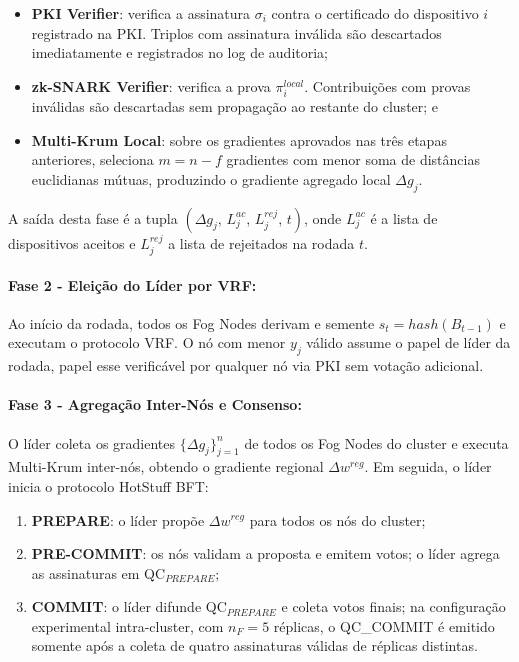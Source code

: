 \documentclass[12pt]{article}
\begin{document}
\begin{itemize}
\item \textbf{PKI Verifier}: verifica a assinatura $\sigma_i$ contra o certificado do dispositivo $i$ registrado na PKI. Triplos com assinatura inválida são descartados imediatamente e registrados no log de auditoria;
\item \textbf{zk-SNARK Verifier}: verifica a prova $\pi_i^{{local}}$. Contribuições com provas inválidas são descartadas sem propagação ao restante do cluster; e
\item \textbf{Multi-Krum Local}: sobre os gradientes aprovados nas três etapas anteriores, seleciona $m = n - f$ gradientes com menor soma de distâncias euclidianas mútuas, produzindo o gradiente agregado local $\Delta g_j$.
\end{itemize}

A saída desta fase é a tupla $(\Delta g_j,\, L_j^{{ac}},\, L_j^{{rej}},\, t)$, onde $L_j^{{ac}}$ é a lista de dispositivos aceitos e $L_j^{{rej}}$ a lista de rejeitados na rodada $t$.

\paragraph{Fase 2 - Eleição do Líder por VRF:} Ao início da rodada, todos os Fog Nodes derivam e semente $s_t = {hash}(B_{t-1})$ e executam o protocolo VRF. O nó com menor $y_j$ válido assume o papel de líder da rodada, papel esse verificável por qualquer nó via PKI sem votação adicional.

\paragraph{Fase 3 - Agregação Inter-Nós e Consenso:} O líder coleta os gradientes $\{\Delta g_j\}_{j=1}^{n}$ de todos os Fog Nodes do cluster e executa Multi-Krum inter-nós, obtendo o gradiente regional $\Delta w^{{reg}}$. Em seguida, o líder inicia o protocolo HotStuff BFT:

\begin{enumerate}
    \item \textbf{PREPARE}: o líder propõe $\Delta w^{{reg}}$ para todos os nós do cluster;
    \item \textbf{PRE-COMMIT}: os nós validam a proposta e emitem votos; o líder agrega as assinaturas em QC$_{{PREPARE}}$;
    \item \textbf{COMMIT}: o líder difunde QC$_{{PREPARE}}$ e coleta votos finais; na configuração experimental intra-cluster, com ${n_F=5}$ réplicas, o QC\_COMMIT é emitido somente após a coleta de quatro assinaturas válidas de réplicas distintas.
\end{enumerate}
\end{document}
